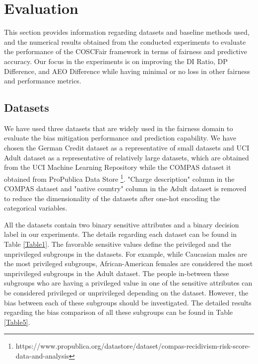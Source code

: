 
\section{Evaluation}\label{sec:eval}

This section provides information regarding datasets and baseline methods used, and the numerical results obtained from the conducted experiments to evaluate the performance of the COSCFair framework in terms of fairness and predictive accuracy. Our focus in the experiments is on improving the DI Ratio, DP Difference, and AEO Difference while having minimal or no loss in other fairness and performance metrics.

\subsection{Datasets} \label{ssec:dfs}

We have used three datasets that are widely used in the fairness domain to evaluate the bias mitigation performance and prediction capability. We have chosen the German Credit dataset as a representative of small datasets and UCI Adult dataset as a representative of relatively large datasets, which are obtained from the UCI Machine Learning Repository \cite{UCIdfs} while the COMPAS dataset it obtained from ProPublica Data Store \footnote{https://www.propublica.org/datastore/dataset/compas-recidivism-risk-score-data-and-analysis}. "Charge description" column in the COMPAS dataset and "native country" column in the Adult dataset is removed to reduce the dimensionality of the datasets after one-hot encoding the categorical variables.

All the datasets contain two binary sensitive attributes and a binary decision label in our experiments. The details regarding each dataset can be found in Table \ref{Table1}. The favorable sensitive values define the privileged and the unprivileged subgroups in the datasets. For example, while Caucasian males are the most privileged subgroups, African-American females are considered the most unprivileged subgroups in the Adult dataset. The people in-between these subgroups who are having a privileged value in one of the sensitive attributes can be considered privileged or unprivileged depending on the dataset. However, the bias between each of these subgroups should be investigated. The detailed results regarding the bias comparison of all these subgroups can be found in Table \ref{Table5}.

